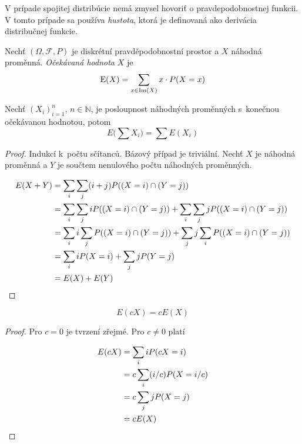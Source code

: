 {V prípade spojitej distribúcie nemá zmysel hovoriť o pravdepodobnostnej
funkcii. V tomto prípade sa používa {\em hustota}, ktorá je definovaná
ako derivácia distribučnej funkcie.

\begin{definition}
    Nechť $(\Omega, \mathcal{F}, P)$ je diskrétní pravděpodobnostní
    prostor a $X$ náhodná proměnná. {\em Očekávaná hodnota} $X$
    je
    \[ \operatorname{E}(X) = \sum_{x \in \operatorname{Im}(X)} x \cdot P(X = x) \]
\end{definition}

\begin{theorem}
    Nechť $(X_i)_{i=1}^{n}$, $n \in \mathbb{N}$, je posloupnost
    náhodných proměnných \linebreak s~konečnou očekávanou hodnotou, potom
    \[
        E \big ( \sum X_i \big ) = \sum E(X_i)
    \]
\end{theorem}

\begin{proof}
    Indukcí k~počtu sčítanců. Bázový případ je triviální. Nechť $X$ je
    náhodná proměnná a $Y$ je součtem nenulového počtu náhodných proměnných.

    \begin{align*}
        E(X + Y) &= \sum_i \sum_j (i+j) P((X = i) \cap (Y = j)) \\
                 &= \sum_i \sum_j i P((X = i) \cap (Y = j))
                  + \sum_i \sum_j j P((X = i) \cap (Y = j)) \\
                 &= \sum_i i \sum_j P((X = i) \cap (Y = j))
                  + \sum_j j \sum_i P((X = i) \cap (Y = j)) \\
                 &= \sum_i i P(X = i)
                  + \sum_j j P(Y = j) \\
                 &= E(X) + E(Y)
                   \qedhere
    \end{align*}
\end{proof}

\begin{theorem}
    \[
        E(cX) = cE(X)
    \]
\end{theorem}

\begin{proof}
    Pro $c = 0$ je tvrzení zřejmé. Pro $c \neq 0$ platí

    \begin{align*}
        E(cX) &=   \sum_i i P(cX = i) \\
              &= c \sum_i (i/c) P(X = i/c) \\
              &= c \sum_j j P(X = j) \\
              &= c E(X)
                \qedhere
    \end{align*}
\end{proof}

}
